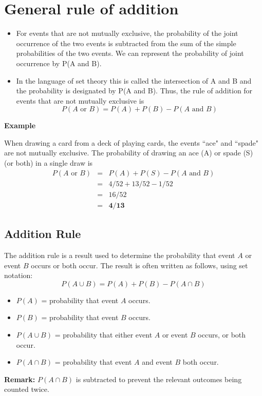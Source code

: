 
\section{General rule of addition}
\begin{itemize}
\item For events that are not mutually exclusive, the probability of the joint occurrence of the two events is
subtracted from the sum of the simple probabilities of the two events. We can represent the probability of joint
occurrence by P(A and B).\item  In the language of set theory this is called the intersection of A and B and the
probability is designated by P(A and B).  Thus, the rule of addition for events that are not mutually exclusive is
\[ P(A \mbox{ or }B) = P(A)+ P(B) - P(A \mbox{ and }B)\]
\end{itemize}

\noindent \textbf{Example}

When drawing a card from a deck of playing cards, the events ``ace" and ``spade" are not mutually
exclusive. The probability of drawing an ace (A) or spade (S) (or both) in a single draw is
\begin{eqnarray} P(A \mbox{ or }B) &=& P(A) + P(S) - P(A \mbox{ and }B)\\ &=& 4/52 + 13/52 -1/52 \\&=& 16/52 \\
&=& \textbf{4/13} 
\end{eqnarray}

\subsection{Addition Rule}
The addition rule is a result used to determine the probability that event $A$ or
event $B$ occurs or both occur. The result is often written as follows, using set
notation:
\[ P(A\cup B) = P(A) + P(B)- P(A \cap B)\]
\begin{itemize}
\item $P(A)$ = probability that event $A$ occurs.
\item $P(B)$ = probability that event $B$ occurs.
\item $P(A\cup B)$ = probability that either event $A$ or event $B$ occurs, or both
occur.
\item $P(A\cap B)$ = probability that event $A$ and event $B$ both occur.
\end{itemize}\bigskip

\noindent \textbf{Remark:} $P(A\cap B)$ is subtracted to prevent the relevant outcomes being
counted twice.



